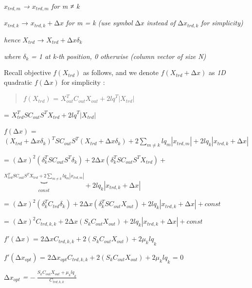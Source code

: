 \(x_{trd,m}\) \emph{→} \(x_{trd,m}\) \emph{for m ≠ k}

\(x_{trd,k}\) → \(x_{trd,k} + \mathrm{\Delta}x\) \emph{for m = k (use
symbol} \(\mathrm{\Delta}x\) \emph{instead of}
\(\mathrm{\Delta}x_{trd,k}\) \emph{for simplicity)}

\emph{hence} \(X_{trd}\) → \(X_{trd} + \mathrm{\Delta}x\delta_{k}\)

\emph{where} \(\delta_{k}\) \emph{= 1 at k-th position, 0 otherwise
(column vector of size N)}

Recall objective \(f(X_{trd})\) as follows, and we denote
\(f(X_{trd} + \mathrm{\Delta}x)\) as \emph{1D} quadratic
\(f(\mathrm{\Delta}x)\) for simplicity :

\begin{quote}
\(f(X_{trd})\) =
\(X_{out}^{T}C_{out}X_{out} + 2{lq}^{T}\left| X_{trd} \right|\)
\end{quote}

= \(X_{trd}^{T}SC_{out}S^{T}X_{trd} + 2{lq}^{T}\left| X_{trd} \right|\)

\(f(\mathrm{\Delta}x)\) =
\({(X_{trd} + \mathrm{\Delta}x\delta_{k})}^{T}SC_{out}S^{T}(X_{trd} + \mathrm{\Delta}x\delta_{k}) + 2\sum_{m \neq k}^{}{{lq}_{m}\left| x_{trd,m} \right|} + 2{lq}_{k}\left| x_{trd,k} + \mathrm{\Delta}x \right|\)

=
\((\mathrm{\Delta}x)^{2}\left( \delta_{k}^{T}SC_{out}S^{T}\delta_{k} \right) + 2\mathrm{\Delta}x\left( \delta_{k}^{T}SC_{out}S^{T}X_{trd} \right) +\)

\(\underset{const}{\overset{X_{trd}^{T}SC_{out}S^{T}X_{trd} + 2\sum_{m \neq k}^{}{{lq}_{m}\left| x_{trd,m} \right|}}{︸}} + 2{lq}_{k}\left| x_{trd,k} + \mathrm{\Delta}x \right|\)

=
\((\mathrm{\Delta}x)^{2}\left( \delta_{k}^{T}C_{trd}\delta_{k} \right) + 2\mathrm{\Delta}x\left( \delta_{k}^{T}SC_{out}X_{out} \right) + 2{lq}_{k}\left| x_{trd,k} + \mathrm{\Delta}x \right| + const\)

=
\((\mathrm{\Delta}x)^{2}C_{trd,k,k} + 2\mathrm{\Delta}x\left( S_{k}C_{out}X_{out} \right) + 2{lq}_{k}\left| x_{trd,k} + \mathrm{\Delta}x \right| + const\)

\(f'(\mathrm{\Delta}x)\) =
\(2\mathrm{\Delta}xC_{trd,k,k} + 2\left( S_{k}C_{out}X_{out} \right) + 2{\mu_{k}lq}_{k}\)

\(f'\left( {\mathrm{\Delta}x}_{opt} \right)\) =
\(2{\mathrm{\Delta}x}_{opt}C_{trd,k,k} + 2\left( S_{k}C_{out}X_{out} \right) + 2{\mu_{k}lq}_{k}\)
= 0

\({\mathrm{\Delta}x}_{opt}\) \emph{=}
\(- \ \frac{S_{k}C_{out}X_{out} + {\mu_{k}lq}_{k}}{C_{trd,k,k}}\)

